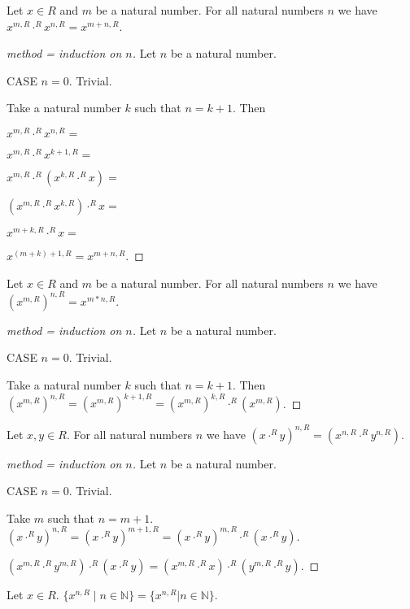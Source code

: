 \documentclass[english,11pt]{article}
\newcommand{\powers}[2]{\{{#1}^{n,#2} \mid n \in \mathbb{N}\}}
\begin{document}
\begin{forthel}
\begin{lemma} Let $x \in R$ and $m$ be a natural number.
For all natural numbers $n$
we have
$x^{m,R} \cdot^{R} x^{n,R} = x^{m + n,R}$.
\end{lemma}
\begin{proof}[method = induction on $n$]
Let $n$ be a natural number.

CASE $n = 0$. Trivial.

Take a natural number $k$ such that $n = k + 1$.
Then

$x^{m,R} \cdot^{R} x^{n,R} = $

$x^{m,R} \cdot^{R} x^{k+1,R} = $

$x^{m,R} \cdot^{R} (x^{k,R} \cdot^{R} x) = $

$(x^{m,R} \cdot^{R} x^{k,R}) \cdot^{R} x = $

$x^{m + k,R} \cdot^{R} x = $

$x^{(m + k)+1,R} = x^{m+n,R}.$
\end{proof}

\begin{lemma} Let $x \in R$ and $m$ be a natural number.
For all natural numbers $n$
we have
$(x^{m,R})^{n,R} = x^{m * n,R}$.
\end{lemma}
\begin{proof}[method = induction on $n$]
Let $n$ be a natural number.

CASE $n = 0$. Trivial.

Take a natural number $k$ such that $n = k + 1$. Then
$(x^{m,R})^{n,R} =
(x^{m,R})^{k+1,R} =
(x^{m,R})^{k,R} \cdot^{R} (x^{m,R})$.
\end{proof}

\begin{lemma} Let $x,y \in R$. For all natural numbers
$n$ we have
$(x \cdot^{R} y)^{n,R} = (x^{n,R} \cdot^{R} y^{n,R})$.
\end{lemma}
\begin{proof}[method = induction on $n$]
Let $n$ be a natural number.

CASE $n = 0$. Trivial.

Take $m$ such that $n = m + 1$.
$(x \cdot^{R} y)^{n,R} =
(x \cdot^{R} y)^{m+1,R} =
(x \cdot^{R} y)^{m,R} \cdot^{R} (x \cdot^{R} y).$

$(x^{m,R} \cdot^{R} y^{m,R}) \cdot^{R} (x \cdot^{R} y) =
(x^{m,R} \cdot^{R} x) \cdot^{R} ( y^{m,R} \cdot^{R} y)$.
\end{proof}

\begin{definition} Let $x \in R$. $\powers{x}{R} = \{x^{n,R} | n \in \mathbb{N} \} $.
\end{definition}


\end{forthel}
\end{document}
